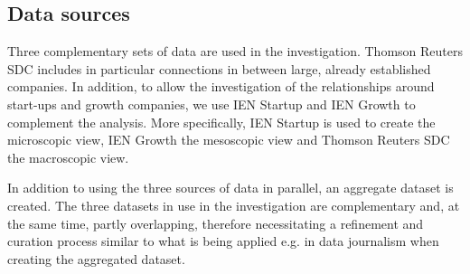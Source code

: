 \subsection{Data sources}

Three complementary sets of data are used in the investigation. Thomson Reuters SDC includes in particular connections in between large, already established companies. In addition, to allow the investigation of the relationships around start-ups and growth companies, we use IEN Startup and IEN Growth to complement the analysis. More specifically, IEN Startup is used to create the microscopic view, IEN Growth the mesoscopic view and Thomson Reuters SDC the macroscopic view.

In addition to using the three sources of data in parallel, an aggregate dataset is created. The three datasets in use in the investigation are complementary and, at the same time, partly overlapping, therefore necessitating a refinement and curation process similar to what is being applied e.g. in data journalism \citep[cf.][]{2012DataHandbook} when creating the aggregated dataset.

